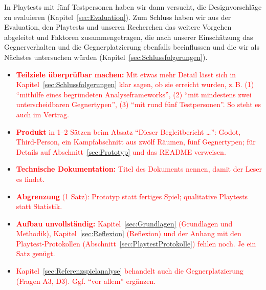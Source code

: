 \documentclass[../Main.tex]{subfiles}
\begin{document}
In Playtests mit fünf Testpersonen haben wir dann versucht, die Designvorschläge zu evaluieren (Kapitel~\ref{sec:Evaluation}). Zum Schluss haben wir aus der Evaluation, den Playtests und unseren Recherchen das weitere Vorgehen abgeleitet und Faktoren zusammengetragen, die nach unserer Einschätzung das Gegnerverhalten und die Gegnerplatzierung ebenfalls beeinflussen und die wir als Nächstes untersuchen würden (Kapitel~\ref{sec:Schlussfolgerungen}).

\begin{itemize}[leftmargin=1.5cm]
    \item \textcolor{red}{\textbf{Teilziele überprüfbar machen:} Mit etwas mehr Detail lässt sich in Kapitel~\ref{sec:Schlussfolgerungen} klar sagen, ob sie erreicht wurden, z.\,B. (1) \enquote{mithilfe eines begründeten Analyseframeworks}, (2) \enquote{mit mindestens zwei unterscheidbaren Gegnertypen}, (3) \enquote{mit rund fünf Testpersonen}. So steht es auch im Vertrag.}
    \item \textcolor{red}{\textbf{Produkt} in 1--2 Sätzen beim Absatz \enquote{Dieser Begleitbericht \ldots}: Godot, Third-Person, ein Kampfabschnitt aus zwölf Räumen, fünf Gegnertypen; für Details auf Abschnitt~\ref{sec:Prototyp} und das README verweisen.}
    \item \textcolor{red}{\textbf{Technische Dokumentation:} Titel des Dokuments nennen, damit der Leser es findet.}
    \item \textcolor{red}{\textbf{Abgrenzung} (1 Satz): Prototyp statt fertiges Spiel; qualitative Playtests statt Statistik.}
    \item \textcolor{red}{\textbf{Aufbau unvollständig:} Kapitel~\ref{sec:Grundlagen} (Grundlagen und Methodik), Kapitel~\ref{sec:Reflexion} (Reflexion) und der Anhang mit den Playtest-Protokollen (Abschnitt~\ref{sec:PlaytestProtokolle}) fehlen noch. Je ein Satz genügt.}
    \item \textcolor{red}{Kapitel~\ref{sec:Referenzspielanalyse} behandelt auch die Gegnerplatzierung (Fragen A3, D3). Ggf. \enquote{vor allem} ergänzen.}
\end{itemize}

\newpage
\end{document}
